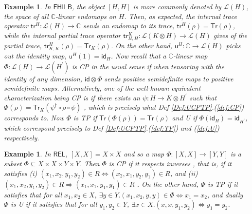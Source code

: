 \documentclass[submission,copyright,creativecommons]{eptcs}
\newtheorem{example}[observation]{Example}
\begin{document}
\begin{example} In $\mathsf{FHILB}$, the object $[H,H]$ is more commonly denoted by $\mathcal{L}(H)$, the space of all $\mathbb{C}$-linear endomaps on $H$. Then, as expected, the internal trace operator $\mathsf{tr}^H: \mathcal{L}(H) \to \mathbb{C}$ sends an endomap to its trace, $\mathsf{tr}^H(\rho) = \mathsf{Tr}(\rho)$, while the internal partial trace operator $\mathsf{tr}^K_{H,H}:\mathcal{L}(K \otimes H) \to \mathcal{L}(H)$ gives of the partial trace, $\mathsf{tr}^H_{K,K}(\rho) = \mathsf{Tr}_K(\rho)$. On the other hand, $\mathsf{u}^H: \mathbb{C} \to \mathcal{L}(H)$ picks out the identity map, $\mathsf{u}^H(1) = \mathsf{id}_H$. Now recall that a $\mathbb{C}$-linear map $\Phi: \mathcal{L}(H) \to \mathcal{L}(H^\prime)$ is CP in the usual sense if when tensoring with the identity of any dimension, $\mathsf{id} \otimes \Phi$ sends positive semidefinite maps to positive semidefinite maps. Alternatively, one of the well-known equivalent characterization being CP is if there exists an $\psi: H \to K \otimes H^\prime$ such that $\Phi(\rho) = \mathsf{Tr}_K\left(\psi^\dagger \circ \rho \circ \psi\right)$ \cite[Thm 2.22]{watrous2018theory}, which is precisely what Def \ref{Def:UCPTP}.(\ref{def:CP}) corresponds to. Now $\Phi$ is TP if $\mathsf{Tr}(\Phi(\rho)) = \mathsf{Tr}(\rho)$ and U if $\Phi(\mathsf{id}_H) = \mathsf{id}_{H^\prime}$, which correspond precisely to Def \ref{Def:UCPTP}.(\ref{def:TP}) and (\ref{def:U}) respectively. 
\end{example}

\begin{example} In $\mathsf{REL}$, $[X,X]= X \times X$ and so a map $\Phi: [X,X] \to [Y,Y]$ is a subset $\Phi \subseteq X \times X \times Y \times Y$. Then $\Phi$ is CP if it respects inverses \cite[Def 5.2 \& Prop 5.3]{coecke2016categories}, that is, if it satisfies (i) $(x_1,x_2,y_1,y_2) \in R \Leftrightarrow (x_2,x_1,y_2,y_1) \in R$, and (ii) $(x_1,x_2,y_1,y_2) \in R \Rightarrow (x_1,x_1, y_1, y_1) \in R$ \cite[Prop 5.3]{coecke2016categories}. On the other hand, $\Phi$ is TP if it satisfies that for all $x_1, x_2 \in X$, $\exists y \in Y. (x_1, x_2, y, y) \in \Phi \Leftrightarrow x_1 = x_2$, and dually $\Phi$ is U if it satisfies that for all $y_1, y_2 \in Y$, $\exists x \in X. (x,x, y_1, y_2) \Leftrightarrow y_1 = y_2$. 
\end{example}
\end{document}
